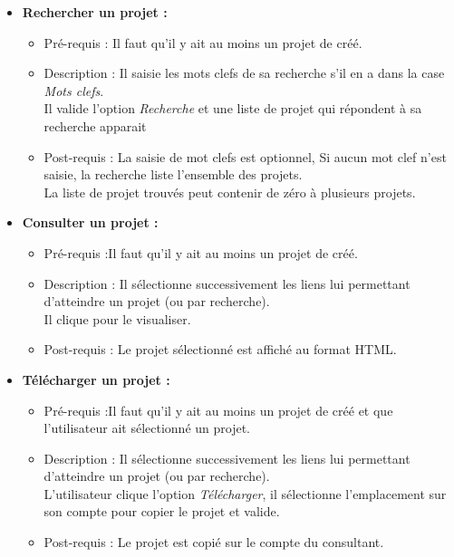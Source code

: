 \begin{itemize}
\item  {\bf Rechercher un projet :}
	\begin{itemize}
	\item Pr{\'e}-requis : Il faut qu'il y ait au moins un projet de cr{\'e}{\'e}.
	\item Description : Il saisie les mots clefs de sa recherche s'il en a dans la case {\it Mots clefs}.\\
	Il valide l'option {\it Recherche} et une liste de projet qui r{\'e}pondent {\`a} sa recherche apparait
	\item Post-requis : La saisie de mot clefs est optionnel, Si aucun mot clef n'est saisie, la recherche liste l'ensemble des projets.\\
	La liste de projet trouv{\'e}s peut contenir de z{\'e}ro {\`a} plusieurs projets.\\
	\end{itemize}

\item  {\bf Consulter un projet :}
	\begin{itemize}
	\item Pr{\'e}-requis :Il faut qu'il y ait au moins un projet de cr{\'e}{\'e}.
	\item Description : Il s{\'e}lectionne successivement les liens lui permettant d'atteindre un projet (ou par recherche).\\
	Il clique pour le visualiser.
	\item Post-requis : Le projet s{\'e}lectionn{\'e} est affich{\'e} au format HTML.\\
	\end{itemize}
			
\item  {\bf T{\'e}l{\'e}charger un projet :}
	\begin{itemize}
	\item Pr{\'e}-requis :Il faut qu'il y ait au moins un projet de cr{\'e}{\'e} et que l'utilisateur ait s{\'e}lectionn{\'e} un projet.
	\item Description : Il s{\'e}lectionne successivement les liens lui permettant d'atteindre un projet (ou par recherche).\\
	L'utilisateur clique l'option {\it T{\'e}l{\'e}charger}, il s{\'e}lectionne l'emplacement sur son compte pour copier le projet et valide.
	\item Post-requis : Le projet est copi{\'e} sur le compte du consultant.\\
	\end{itemize}
\end{itemize}

